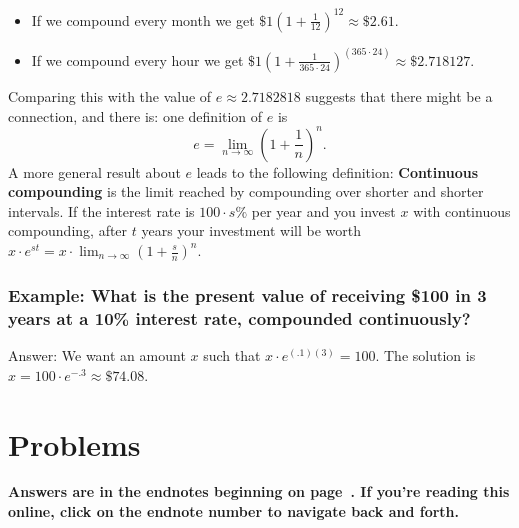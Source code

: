 \begin{CALCULUS}
\begin{itemize}
\item If we compound every month we get $\displaystyle \$1\left(1+\frac{1}{12}\right)^{12}\approx\$2.61$.

\item If we compound every hour we get $\displaystyle \$1\left(1+\frac{1}{365\cdot 24}\right)^{(365\cdot 24)}\approx\$2.718127$.
\end{itemize}
%
Comparing this with the value of $e\approx 2.7182818$ suggests that there might be a connection, and there is: one definition of $e$ is
\[
e = \lim_{n\rightarrow \infty} \left( 1 + \frac{1}{n} \right)^{n}.
\]
A more general result about $e$ leads to the following definition: \textbf{Continuous compounding} is the limit reached by compounding over shorter and shorter intervals. If the interest rate is $100\cdot s\%$ per year and you invest $x$ with continuous compounding, after $t$ years your investment will be worth $\displaystyle x\cdot e^{st}=x\cdot \lim_{n\rightarrow \infty} \left( 1 + \frac{s}{n} \right)^{n}$.

\subsubsection*{Example: \rm What is the present value of receiving \$100 in 3 years at a 10\% interest rate, compounded continuously?}

\noindent Answer: We want an amount $x$ such that $x\cdot e^{(.1)(3)}=100.$ The solution is $x=100\cdot e^{-.3}\approx \$74.08.$

\end{CALCULUS}




\bigskip
\bigskip
\section*{Problems}

\noindent \textbf{Answers are in the endnotes beginning on page~\pageref{1timea}. If you're reading this online, click on the endnote number to navigate back and forth.}


